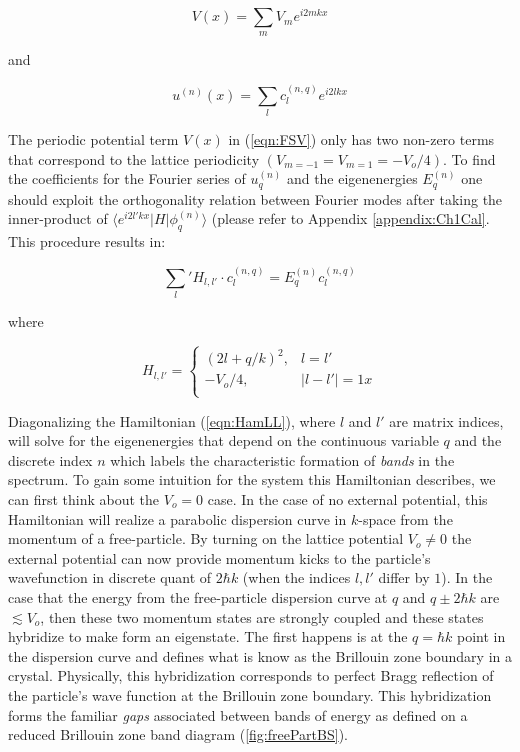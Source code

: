 \begin{equation}
\label{eqn:FSV}
V(x) = \sum_m V_m e^{i  2 m k x}
\end{equation}

and

\begin{equation}
\label{eqn:ux}
u^{(n)}(x) = \sum_l c_l^{(n,q)} e^{i 2 l k x}
\end{equation}

The periodic potential term $V(x)$ in (\ref{eqn:FSV}) only has two non-zero terms that correspond to the lattice periodicity $ \left ( V_{m=-1} = V_{m=1} = -V_o / 4 \right ) $. To find the coefficients for the Fourier series of $u_q^{(n)}$ and the eigenenergies $E_q^{(n)}$ one should exploit the orthogonality relation between Fourier modes after taking the inner-product  of $\langle e^{i 2 l' k x} | H | \phi_q^{(n)} \rangle$ (please refer to Appendix \ref{appendix:Ch1Cal}. This procedure results in:

\begin{equation}
\label{eqn:HamC}
\sum_l' H_{l,l'} \cdot c_l^{(n,q)} = E_q^{(n)} c_l^{(n,q)}
\end{equation}

where

\begin{equation}
\label{eqn:HamLL}
H_{l,l'} = \left \{
\begin{array}{ll}
      (2 l + q / k)^2 ,& l=l' \\
      -V_o/4, & | l-l' | = 1 x \\
\end{array} 
\right .
\end{equation}

Diagonalizing the Hamiltonian (\ref{eqn:HamLL}), where $l$ and $l'$ are matrix indices, will solve for the eigenenergies that depend on the continuous variable $q$ and the discrete index $n$ which labels the characteristic formation of \emph{bands} in the spectrum. To gain some intuition for the system this Hamiltonian describes, we can first think about the $V_o=0$ case. In the case of no external potential, this Hamiltonian will realize a parabolic dispersion curve in $k$-space from the momentum of a free-particle. By turning on the lattice potential $V_o \neq 0 $ the external potential can now provide momentum kicks to the particle's wavefunction in discrete quant of $2\hbar k$ (when the indices $l,l'$ differ by $1$). In the case that the energy from the free-particle dispersion curve at  $q$ and $q\pm 2\hbar k$ are $\lesssim V_o$, then these two momentum states are strongly coupled and these states hybridize to make form an eigenstate. The first happens is at the $q=\hbar k$ point in the dispersion curve and defines what is know as the Brillouin zone boundary in a crystal. Physically, this hybridization corresponds to perfect Bragg reflection of the particle's wave function at the Brillouin zone boundary. This hybridization forms the familiar \emph{gaps} associated between bands of energy as defined on a reduced Brillouin zone band diagram (\ref{fig:freePartBS}).

